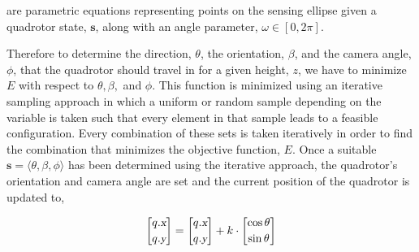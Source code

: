 \documentclass[12pt]{article}
\newcommand{\Var}[1]{\ensuremath{{\small{\textsl{#1}}}}}
\newcommand{\s}{\textbf{s}}
\begin{document}

%


are parametric equations representing points on the sensing ellipse given a
quadrotor state, $\s$, along with an angle parameter, $\omega \in [0, 2\pi]$.

Therefore to determine the direction, $\theta$, the orientation, $\beta$, and
the camera angle, $\phi$, that the quadrotor should travel in for a given
height, $z$, we have to minimize $E$ with respect to $\theta, \beta,$ and
$\phi$. This function is minimized using an iterative sampling approach in
which a uniform or random sample depending on the variable is taken such that
every element in that sample leads to a feasible configuration. Every
combination of these sets is taken iteratively in order to find the combination
that minimizes the objective function, $E$. Once a suitable $\s = \langle
\theta, \beta, \phi \rangle$ has been determined using the iterative approach,
the quadrotor's orientation and camera angle are set and the current position
of the quadrotor is  updated to,

$$
\begin{bmatrix} q.\Var{x} \\[0.2em]
    q.\Var{y}
\end{bmatrix} = \begin{bmatrix}
    q.\Var{x} \\[0.2em] q.\Var{y}
\end{bmatrix} + k \cdot \begin{bmatrix} \cos{\theta} \\[0.2em] \sin{\theta}
\end{bmatrix}
$$
\end{document}
